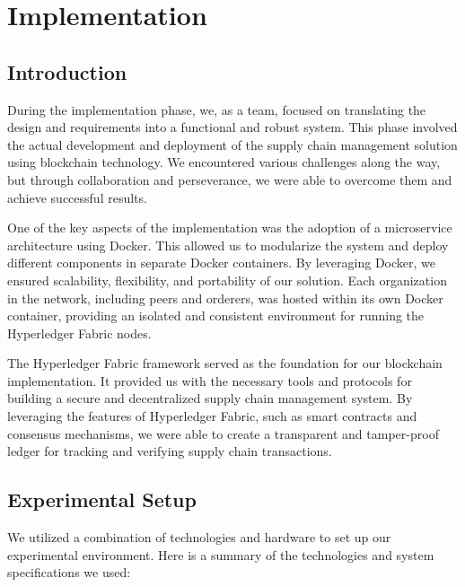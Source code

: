 
\chapter{Implementation}\doublespacing %

\label{Chapter6} %


\section{Introduction}
During the implementation phase, we, as a team, focused on translating the design and requirements into a functional and robust system. This phase involved the actual development and deployment of the supply chain management solution using blockchain technology. We encountered various challenges along the way, but through collaboration and perseverance, we were able to overcome them and achieve successful results.
\par One of the key aspects of the implementation was the adoption of a microservice architecture using Docker. This allowed us to modularize the system and deploy different components in separate Docker containers. By leveraging Docker, we ensured scalability, flexibility, and portability of our solution. Each organization in the network, including peers and orderers, was hosted within its own Docker container, providing an isolated and consistent environment for running the Hyperledger Fabric nodes.
\par The Hyperledger Fabric framework served as the foundation for our blockchain implementation. It provided us with the necessary tools and protocols for building a secure and decentralized supply chain management system. By leveraging the features of Hyperledger Fabric, such as smart contracts and consensus mechanisms, we were able to create a transparent and tamper-proof ledger for tracking and verifying supply chain transactions.



\section{ Experimental Setup}
We utilized a combination of technologies and hardware to set up our experimental environment. Here is a summary of the technologies and system specifications we used:

